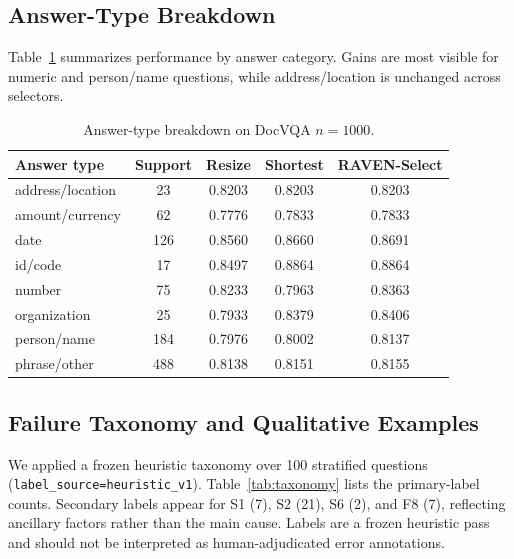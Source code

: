 \documentclass[journal]{IEEEtran}
\begin{document}
\subsection{Answer-Type Breakdown}
Table~\ref{tab:answer-types} summarizes performance by answer category.  Gains
are most visible for numeric and person/name questions, while address/location
is unchanged across selectors.

\begin{table}[t]
\centering
\caption{Answer-type breakdown on DocVQA $n=1000$.}
\label{tab:answer-types}
\scriptsize
\setlength{\tabcolsep}{2pt}
\begin{tabular}{lcccc}
\toprule
Answer type & Support & Resize & Shortest & RAVEN-Select\\
\midrule
address/location & 23 & 0.8203 & 0.8203 & 0.8203\\
amount/currency & 62 & 0.7776 & 0.7833 & 0.7833\\
date & 126 & 0.8560 & 0.8660 & 0.8691\\
id/code & 17 & 0.8497 & 0.8864 & 0.8864\\
number & 75 & 0.8233 & 0.7963 & 0.8363\\
organization & 25 & 0.7933 & 0.8379 & 0.8406\\
person/name & 184 & 0.7976 & 0.8002 & 0.8137\\
phrase/other & 488 & 0.8138 & 0.8151 & 0.8155\\
\bottomrule
\end{tabular}
\end{table}

\subsection{Failure Taxonomy and Qualitative Examples}
We applied a frozen heuristic taxonomy over 100 stratified questions
(\texttt{label\_source=heuristic\_v1}).  Table~\ref{tab:taxonomy} lists the
primary-label counts.  Secondary labels appear for S1 (7), S2 (21), S6 (2), and
F8 (7), reflecting ancillary factors rather than the main cause.  Labels are a
frozen heuristic pass and should not be interpreted as human-adjudicated error
annotations.
\end{document}
